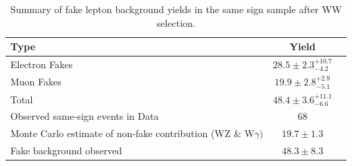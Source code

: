 \begin{table}[!htbp]
\begin{center}
\begin{tabular}{|l|c|c|}
\hline
Type           & Yield \\
\hline
Electron Fakes          &  $28.5\pm2.3^{+10.7}_{-4.2}$   \\
Muon Fakes              &  $19.9\pm2.8^{+2.9}_{-5.1}$   \\
Total                   &  $48.4\pm3.6^{+11.1}_{-6.6}$  \\
\hline
Observed same-sign events in Data        &  $68$   \\
Monte Carlo estimate of non-fake contribution (WZ \& W$\gamma)$         &  $19.7\pm1.3$\\
Fake background observed  &  $48.3\pm8.3$  \\

\hline
\end{tabular}
\caption{Summary of fake lepton background yields in the same sign sample after WW selection. }
\label{tab:FakeLeptonBkgPrediction_SameSignSample}
\end{center}
\end{table}



